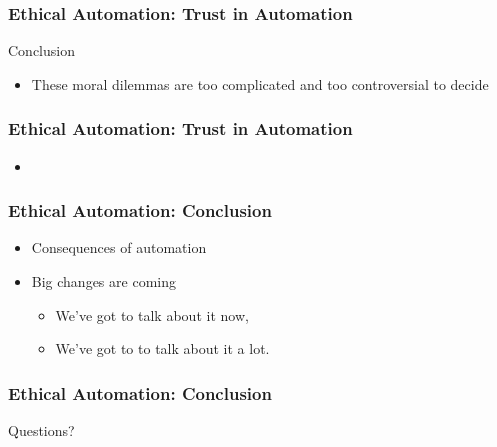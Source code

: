 \begin{frame}
  \frametitle{ Ethical Automation: Trust in Automation}
  {\Large Conclusion}
  \begin{itemize}
  \item These moral dilemmas are too complicated and too controversial to decide
  \end{itemize}
\end{frame}


\begin{frame}
  \frametitle{ Ethical Automation: Trust in Automation}
  \begin{itemize}
  \item
  \end{itemize}
\end{frame}


\begin{frame}
  \frametitle{ Ethical Automation: Conclusion}
  \begin{itemize}
  \item Consequences of automation
  \item Big changes are coming
    \begin{itemize}
    \item We've got to talk about it now,
    \item We've got to to talk about it a lot.
    \end{itemize}
  \end{itemize}
\end{frame}


\begin{frame}
  \frametitle{ Ethical Automation: Conclusion}
  \Large Questions?
\end{frame}
